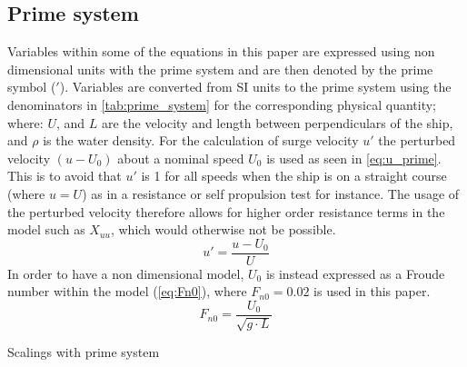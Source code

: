 \subsection{Prime system}
\label{sec:prime_system}
Variables within some of the equations in this paper are expressed using non dimensional units with the prime system and are then denoted by the prime symbol ($'$). Variables are converted from SI units to the prime system using the denominators in \autoref{tab:prime_system} for the corresponding physical quantity; where: $U$, and $L$ are the velocity and length between perpendiculars of the ship, and $\rho$ is the water density.
For the calculation of surge velocity $u'$ the perturbed velocity $(u-U_0)$ about a nominal speed $U_0$ is used as seen in \autoref{eq:u_prime}. This is to avoid that $u'$ is 1 for all speeds when the ship is on a straight course (where $u=U$) as in a resistance or self propulsion test for instance. The usage of the perturbed velocity therefore allows for higher order resistance terms in the model such as $X_{uu}$, which would otherwise not be possible. 
\begin{equation}
    \label{eq:u_prime}
    u' = \frac{u-U_0}{U}
\end{equation}
In order to have a non dimensional model, $U_0$ is instead expressed as a Froude number within the model (\autoref{eq:Fn0}), where $F_{n0}=0.02$ is used in this paper.
\begin{equation}
    \label{eq:Fn0}
    F_{n0} = \frac{U_0}{\sqrt{g \cdot L}}
\end{equation}

\begin{table}[h]
    \centering
    \caption{Scalings with prime system}
    \label{tab:prime_system}
\end{table}